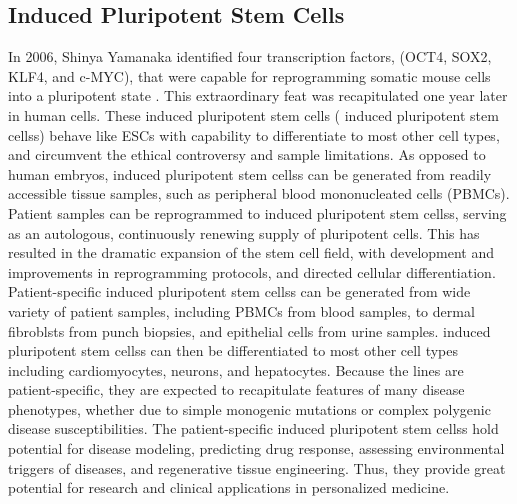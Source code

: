 \documentclass[sigconf]{acmart}
\begin{document}
\subsection{Induced Pluripotent Stem Cells} 
In 2006, Shinya Yamanaka identified four transcription factors, (OCT4, SOX2, KLF4, and c-MYC), that were capable for reprogramming somatic mouse cells into a pluripotent state \cite{takahashi2007induction}. This extraordinary feat was recapitulated one year later in human cells. These induced
pluripotent stem cells ( induced pluripotent stem cellss) behave like ESCs with capability to differentiate to most other cell
types, and circumvent the ethical controversy and sample limitations. As opposed to human
embryos,  induced pluripotent stem cellss can be generated from readily accessible tissue samples, such as peripheral
blood mononucleated cells (PBMCs). Patient samples can be reprogrammed to  induced pluripotent stem cellss, serving
as an autologous, continuously renewing supply of pluripotent cells.
This has resulted in the dramatic expansion of the stem cell field, with development and
improvements in reprogramming protocols, and directed cellular differentiation. Patient-specific
 induced pluripotent stem cellss can be generated from wide variety of patient samples, including PBMCs from blood
samples, to dermal fibroblsts from punch biopsies, and epithelial cells from urine samples.
 induced pluripotent stem cellss can then be differentiated to most other cell types including cardiomyocytes, neurons, and
hepatocytes. Because the lines are patient-specific, they are expected to recapitulate features of
many disease phenotypes, whether due to simple monogenic mutations or complex polygenic
disease susceptibilities. The patient-specific  induced pluripotent stem cellss hold potential for disease modeling,
predicting drug response, assessing environmental triggers of diseases, and regenerative tissue engineering. Thus, they provide
great potential for research and clinical applications in personalized medicine.
\end{document}
